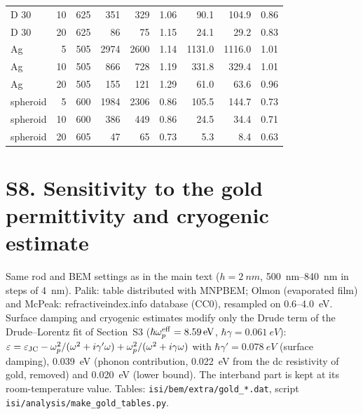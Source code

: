 \documentclass[11pt,a4paper]{article}
\begin{document}
\begin{table}[h]
\begin{tabular}{lrrrrrrrr}
D 30 & 10 & 625 & 351 & 329 & 1.06 & 90.1 & 104.9 & 0.86\\
D 30 & 20 & 625 & 86 & 75 & 1.15 & 24.1 & 29.2 & 0.83\\
Ag & 5 & 505 & 2974 & 2600 & 1.14 & 1131.0 & 1116.0 & 1.01\\
Ag & 10 & 505 & 866 & 728 & 1.19 & 331.8 & 329.4 & 1.01\\
Ag & 20 & 505 & 155 & 121 & 1.29 & 61.0 & 63.6 & 0.96\\
spheroid & 5 & 600 & 1984 & 2306 & 0.86 & 105.5 & 144.7 & 0.73\\
spheroid & 10 & 600 & 386 & 449 & 0.86 & 24.5 & 34.4 & 0.71\\
spheroid & 20 & 605 & 47 & 65 & 0.73 & 5.3 & 8.4 & 0.63\\
\bottomrule\end{tabular}\end{table}

\section*{S8. Sensitivity to the gold permittivity and cryogenic estimate}
Same rod and BEM settings as in the main text ($h=\SI{2}{nm}$, \SIrange{500}{840}{nm} in steps of \SI{4}{nm}).
Palik: table distributed with MNPBEM; Olmon (evaporated film) and McPeak: refractiveindex.info database (CC0), resampled
on 0.6--\SI{4.0}{eV}. Surface damping and cryogenic estimates modify only the Drude term of the Drude--Lorentz fit of
Section~S3 ($\hbar\omega_p^{\rm eff}=\SI{8.59}{eV}$, $\hbar\gamma=\SI{0.061}{eV}$):
$\varepsilon=\varepsilon_{\rm JC}-\omega_p^2/(\omega^2+i\gamma'\omega)+\omega_p^2/(\omega^2+i\gamma\omega)$ with
$\hbar\gamma'=\SI{0.078}{eV}$ (surface damping), \SI{0.039}{eV} (phonon contribution, \SI{0.022}{eV} from the
dc resistivity of gold, removed) and \SI{0.020}{eV} (lower bound). The interband part is kept at its room-temperature
value. Tables: \texttt{isi/bem/extra/gold\_*.dat}, script \texttt{isi/analysis/make\_gold\_tables.py}.
\end{document}

